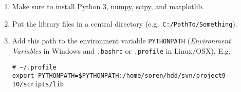 \begin{enumerate}
\item Make sure to install Python 3, numpy, scipy, and matplotlib.
\item Put the library files in a central directory (e.g.\ \texttt{C:/PathTo/Something}).
\item Add this path to the environment variable \texttt{PYTHONPATH} (\emph{Environment Variables} in Windows and \texttt{.bashrc} or \texttt{.profile} in Linux/OSX). E.g.\
    \begin{verbatim}
# ~/.profile
export PYTHONPATH=$PYTHONPATH:/home/soren/hdd/svn/project9-10/scripts/lib
    \end{verbatim}
\end{enumerate}
